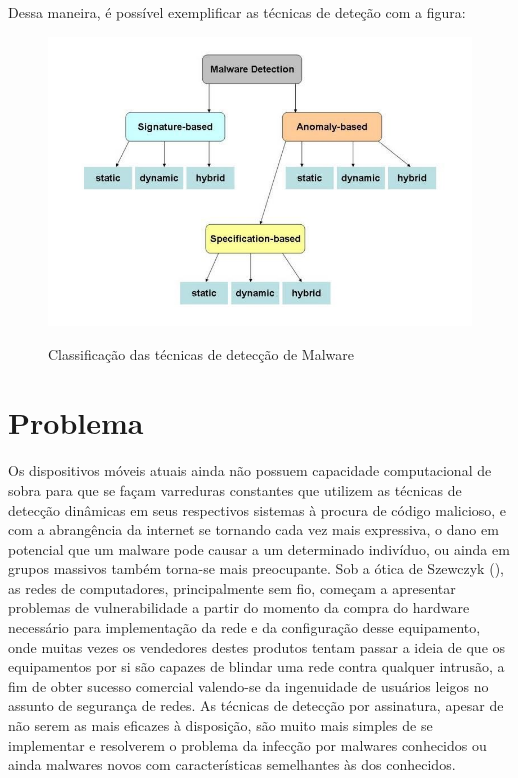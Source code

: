 Dessa maneira, é possível exemplificar as técnicas de deteção com a figura:

\begin{figure}[h]
\caption{\small Classificação das técnicas de detecção de Malware}
\centering
\includegraphics[scale=0.8]{figs/fig1}
\label{f.metodos_deteccao_01}
\end{figure}

\chapter{Problema}
\label{c.problema}

Os dispositivos móveis atuais ainda não possuem capacidade computacional de
sobra para que se façam varreduras constantes que utilizem as técnicas de
detecção dinâmicas em seus respectivos sistemas à procura de código malicioso,
e com a abrangência da internet se tornando cada vez mais expressiva, o dano
em potencial que um malware pode causar a um determinado indivíduo, ou ainda
em grupos massivos também torna-se mais preocupante. Sob a ótica de Szewczyk
(\citeyear{szewczyk12}), as redes de computadores, principalmente sem fio, começam a apresentar
problemas de vulnerabilidade a partir do momento da compra do hardware
necessário para implementação da rede e da configuração desse equipamento,
onde muitas vezes os vendedores destes produtos tentam passar a ideia de que
os equipamentos por si são capazes de blindar uma rede contra qualquer
intrusão, a fim de obter sucesso comercial valendo-se da ingenuidade de
usuários leigos no assunto de segurança de redes. As técnicas de detecção por
assinatura, apesar de não serem as mais eficazes à disposição, são muito mais
simples de se implementar e resolverem o problema da infecção por malwares
conhecidos ou ainda malwares novos com características semelhantes às dos
conhecidos.




